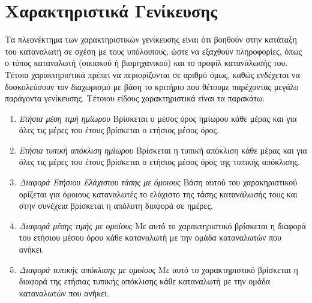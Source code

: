 \documentclass[a4paper, 11pt]{article}
\begin{document}
\section*{Χαρακτηριστικά Γενίκευσης} 
Τα πλεονέκτημα των χαρακτηριστικών γενίκευσης είναι ότι βοηθούν στην κατάταξη του καταναλωτή σε σχέση με τους υπόλοιπους, ώστε να εξαχθούν πληροφορίες, όπως ο τύπος καταναλωτή (οικιακού ή βιομηχανικού) και το προφίλ κατανάλωσής του. Τέτοια χαρακτηριστικά πρέπει να περιορίζονται σε αριθμό όμως, καθώς ενδέχεται να δυσκολεύσουν τον διαχωρισμό με βάση το κριτήριο που θέτουμε παρέχοντας μεγάλο παράγοντα γενίκευσης.  Τέτοιου είδους χαρακτηριστικά είναι τα παρακάτω:
\begin{enumerate}
\item{\textit{Ετήσια μέση τιμή ημίωρου}} Βρίσκεται ο μέσος όρος ημίωρου κάθε μέρας και για όλες τις μέρες του έτους βρίσκεται ο ετήσιος μέσος όρος.
\item{\textit{Ετήσια τυπική απόκλιση ημίωρου}} Βρίσκεται η τυπική απόκλιση κάθε μέρας και για όλες τις μέρες του έτους βρίσκεται ο ετήσιος μέσος όρος της τυπικής απόκλισης.
\item{\textit{Διαφορά Ετήσιου Ελάχιστου τάσης με όμοιους}} Βάση αυτού του χαρακηριστικού ορίζεται για όμοιους καταναλωτές το ελάχιστο της τάσης κατανάλωσής τους και στην συνέχεια βρίσκεται η απόλυτη διαφορά σε  ημέρες.
\item{\textit{Διαφορά μέσης τιμής με ομοίους}} Με αυτό το χαρακτηριστικό βρίσκεται η διαφορά του ετήσιου μέσου όρου κάθε καταναλωτή με την ομάδα καταναλωτών που ανήκει.
\item{\textit{Διαφορά τυπικής απόκλισης με ομοίους}} Με αυτό το χαρακτηριστικό βρίσκεται η διαφορά της ετήσιας τυπικής απόκλισης κάθε καταναλωτή με την ομάδα καταναλωτών που ανήκει.
\end{enumerate}
\end{document}
